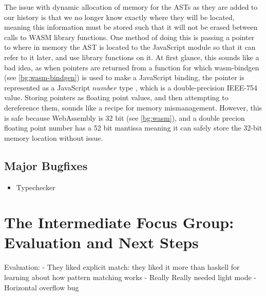 The issue with dynamic allocation of memory for the \ac{AST}s as they are added to our history is that we no longer know exactly where they will be located, meaning this information must be stored such that it will not be erased between calls to \ac{WASM} library functions. One method of doing this is passing a pointer to where in memory the AST is located to the JavaScript module so that it can refer to it later, and use library functions on it. At first glance, this sounds like a bad idea, as when pointers are returned from a function for which wasm-bindgen (see \ref{bg:wasm-bindgen}) is used to make a JavaScript binding, the pointer is represented as a JavaScript $number$ type \cite{wasm_bindgen_guide}, which is a double-precision IEEE-754 value\cite{ecma262number}. Storing pointers as floating point values, and then attempting to dereference them, sounds like a recipe for memory mismanagement. However, this is safe because WebAssembly is 32 bit (see \ref{bg:wasm}), and a double precion floating point number has a 52 bit  \cite{ieee754} mantissa meaning it can safely store the 32-bit memory location without issue. 

\subsection{Major Bugfixes}
\begin{itemize}
    \item Typechecker
\end{itemize}

\section{The Intermediate Focus Group: Evaluation and Next Steps}
\label{eval:IFG}
Evaluation:
- They liked explicit match: they liked it more than haskell for learning about how pattern matching works
- Really Really needed light mode
- Horizontal overflow bug